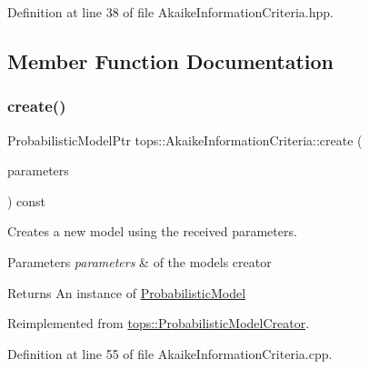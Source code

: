 Definition at line 38 of file Akaike\+Information\+Criteria.\+hpp.



\subsection{Member Function Documentation}
\mbox{\label{classtops_1_1AkaikeInformationCriteria_a925de08fa8373de8f7ddf48cd6b2c6e0}} 
\subsubsection{\texorpdfstring{create()}{create()}}
{\footnotesize\ttfamily Probabilistic\+Model\+Ptr tops\+::\+Akaike\+Information\+Criteria\+::create (\begin{DoxyParamCaption}\item[{\hyperlink{classtops_1_1ProbabilisticModelParameters}{Probabilistic\+Model\+Parameters} \&}]{parameters }\end{DoxyParamCaption}) const\hspace{0.3cm}{\ttfamily [virtual]}}



Creates a new model using the received parameters. 


\begin{DoxyParams}{Parameters}
{\em parameters} & of the model\textquotesingle{}s creator \\
\hline
\end{DoxyParams}
\begin{DoxyReturn}{Returns}
An instance of \hyperlink{classtops_1_1ProbabilisticModel}{Probabilistic\+Model} 
\end{DoxyReturn}


Reimplemented from \hyperlink{classtops_1_1ProbabilisticModelCreator_afed6c8ffa45fff446bdaa8b533da8f7c}{tops\+::\+Probabilistic\+Model\+Creator}.



Definition at line 55 of file Akaike\+Information\+Criteria.\+cpp.


